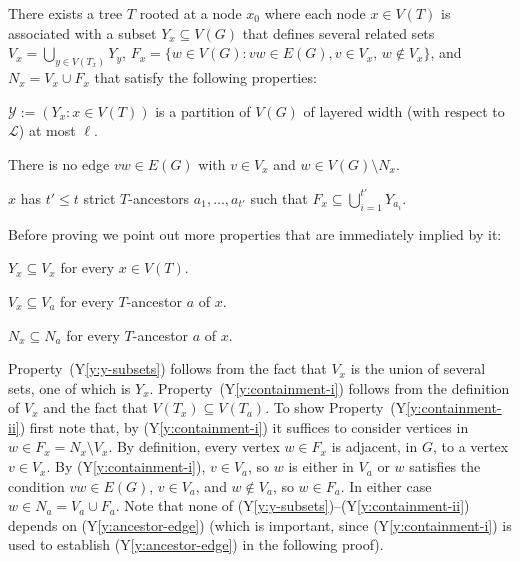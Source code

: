 \documentclass{patmorin}
\newcommand{\ylabel}[1]{\label{y:#1}}
\newcommand{\yref}[1]{(Y\ref{y:#1})}
\begin{document}
\begin{lem}
  There exists a tree $T$ rooted at a node $x_0$ where each node $x\in V(T)$ is associated with a subset $Y_x\subseteq V(G)$ that defines several related sets $V_x = \bigcup_{y\in V(T_x)} Y_y$, $F_x=\{w\in V(G): vw\in E(G), v\in V_x,\, w\not\in V_x\}$, and $N_x=V_x\cup F_x$ that satisfy the following properties:
  \begin{compactenum}[(Y1)]
    \item\ylabel{thickness} $\mathcal{Y}:=(Y_x: x\in V(T))$ is a partition of $V(G)$ of layered width (with respect to $\mathcal{L}$) at most $\ell$.
    \item\ylabel{separator} There is no edge $vw\in E(G)$ with $v\in V_x$ and $w\in V(G)\setminus N_x$. 
    \item\ylabel{ancestor-edge} $x$ has $t'\le t$ strict $T$-ancestors $a_1,\ldots,a_{t'}$ such that $F_x \subseteq \bigcup_{i=1}^{t'} Y_{a_i}$.
  \end{compactenum}
\end{lem}

Before proving  we point out more properties that are immediately implied by it:

\begin{compactenum}[(Y1)]\setcounter{enumi}{3}
  \item\ylabel{y-subsets} $Y_x\subseteq V_x$ for every $x\in V(T)$. 
  \item\ylabel{containment-i} $V_x\subseteq V_a$ for every $T$-ancestor $a$ of $x$. 
  \item\ylabel{containment-ii}$N_x\subseteq N_a$ for every $T$-ancestor $a$ of $x$.
\end{compactenum}

Property~\yref{y-subsets} follows from the fact that $V_x$ is the union of several sets, one of which is $Y_x$.  Property~\yref{containment-i} follows from the definition of $V_x$ and the fact that $V(T_x)\subseteq V(T_a)$. To show Property~\yref{containment-ii} first note that, by \yref{containment-i} it suffices to consider vertices in $w\in F_x=N_x\setminus V_x$. By definition, every vertex $w\in F_x$ is adjacent, in $G$, to a vertex $v\in V_x$.  By \yref{containment-i}, $v\in V_a$, so $w$ is either in $V_a$ or $w$ satisfies the condition $vw\in E(G)$, $v\in V_a$, and $w\not\in V_a$, so $w\in F_a$.  In either case $w\in N_a=V_a\cup F_a$.  Note that none of \yref{y-subsets}--\yref{containment-ii} depends on \yref{ancestor-edge} (which is important, since \yref{containment-i} is used to establish \yref{ancestor-edge} in the following proof).
\end{document}
